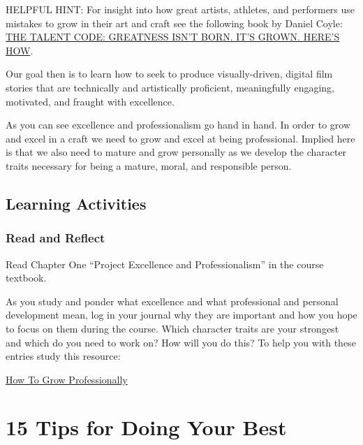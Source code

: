 \documentclass[
]{book}
\begin{document}
HELPFUL HINT: For insight into how great artists, athletes, and performers use mistakes to grow in their art and craft see the following book by Daniel Coyle: \href{http://danielcoyle.com/the-talent-code/}{THE TALENT CODE: GREATNESS ISN'T BORN. IT'S GROWN. HERE'S HOW}.

Our goal then is to learn how to seek to produce visually-driven, digital film stories that are technically and artistically proficient, meaningfully engaging, motivated, and fraught with excellence.

As you can see excellence and professionalism go hand in hand. In order to grow and excel in a craft we need to grow and excel at being professional. Implied here is that we also need to mature and grow personally as we develop the character traits necessary for being a mature, moral, and responsible person.

\hypertarget{learning-activities-2}{%
\subsection*{Learning Activities}\label{learning-activities-2}}

\begin{reflect}
\hypertarget{read-and-reflect}{%
\subsubsection*{Read and Reflect}\label{read-and-reflect}}

Read Chapter One ``Project Excellence and Professionalism'' in the course textbook.

As you study and ponder what excellence and what professional and personal development mean, log in your journal why they are important and how you hope to focus on them during the course. Which character traits are your strongest and which do you need to work on? How will you do this? To help you with these entries study this resource:

\href{https://brandyourself.com/blog/guide/how-to-grow-professionally/}{How To Grow Professionally}
\end{reflect}

\hypertarget{tips-for-doing-your-best}{%
\section{15 Tips for Doing Your Best}\label{tips-for-doing-your-best}}
\end{document}
